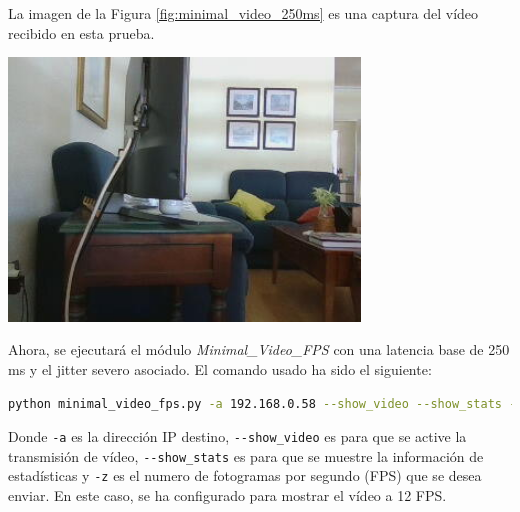\newpage
La imagen de la Figura \ref{fig:minimal_video_250ms} es una captura del vídeo recibido en esta prueba.
\begin{center}
  \includegraphics[width = 0.7\textwidth]{images/VideoRecibido6.1.png}
  \label{fig:minimal_video_250ms}
\end{center}

\newpage


Ahora, se ejecutará el módulo \textit{Minimal\_Video\_FPS} con una latencia base de 250 ms y el jitter severo asociado. El comando usado ha sido el siguiente:

\begin{lstlisting}[language=bash, basicstyle=\ttfamily\scriptsize]
    python minimal_video_fps.py -a 192.168.0.58 --show_video --show_stats -z 12
\end{lstlisting}
Donde \verb|-a| es la dirección IP destino, \verb|--show_video| es para que se active la transmisión de vídeo, \verb|--show_stats| es para que se muestre la información de estadísticas y \verb|-z| es el numero de fotogramas por segundo (FPS) que se desea enviar. En este caso, se ha configurado para mostrar el vídeo a 12 FPS.
\vspace{\baselineskip}

